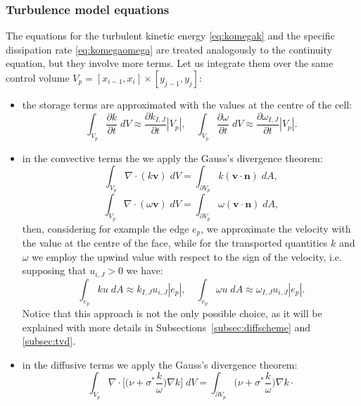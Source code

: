 \subsubsection{Turbulence model equations}
The equations for the turbulent kinetic energy \eqref{eq:komegak} and the 
specific dissipation rate \eqref{eq:komegaomega} are treated analogously to the 
continuity equation, but they involve more terms. Let us integrate them over 
the same control volume  $V_p = [x_{i-1},x_i] \times [y_{j-1},y_j]$:
\begin{itemize}
	\item the storage terms are approximated with the values at the centre of 
	the cell:
	\begin{equation}
	\int_{V_p} \frac{\partial k}{\partial t} \; dV \approx \frac{\partial 
	k_{I,J}}{\partial t}|V_p|, \quad \int_{V_p} \frac{\partial \omega}{\partial 
	t} \; dV \approx \frac{\partial \omega_{I,J}}{\partial t}|V_p|.
	\end{equation}
	\item in the convective terms the we apply the Gauss's divergence theorem:
	\begin{equation}
		\int_{V_p} \nabla \cdot (k \mathbf{v}) \; dV = \int_{\partial V_p} k 
		(\mathbf{v} 
		\cdot \mathbf{n}) \; dA,
	\end{equation}
	\begin{equation}
	\int_{V_p} \nabla \cdot (\omega \mathbf{v}) \; dV = \int_{\partial V_p} 
	\omega 
	(\mathbf{v} \cdot \mathbf{n}) \; dA,
	\end{equation}
	then, considering for example the edge $e_p$, we approximate the velocity 
	with the value at the centre of the face, while for the transported 
	quantities $k$ and $\omega$ we employ the upwind value with respect to the 
	sign of the velocity, i.e. supposing that $u_{i,J}>0$ we have:
	\begin{equation}
		\int_{e_p} ku \; dA \approx k_{I,J}u_{i,J}|e_p|, \quad \int_{e_p} 
		\omega u \; dA \approx \omega_{I,J}u_{i,J}|e_p|.
	\end{equation}
	Notice that this approach is not the only possible choice, as it will be 
	explained with more details in Subsections~\ref{subsec:diffscheme} and 
	\ref{subsec:tvd}.
	\item in the diffusive terms we apply the Gauss's divergence theorem:
	\begin{equation}
		\int_{V_p} \nabla \cdot \bigg[\bigg(\nu + 
		\sigma^*\frac{k}{\omega}\bigg) \nabla k\bigg] \; dV = \int_{\partial 
		V_p} \bigg(\nu + \sigma^*\frac{k}{\omega}\bigg) \nabla k \cdot 

\end{equation}
\end{itemize}
